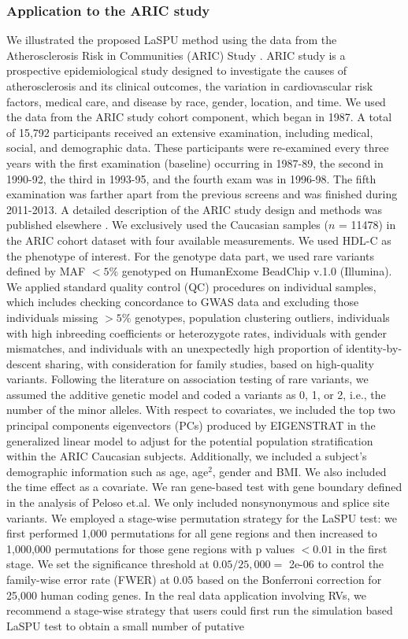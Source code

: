 \documentclass[12pt]{article}
\begin{document}
\subsubsection{Application to the ARIC study}
We illustrated the proposed LaSPU method using the data from the Atherosclerosis Risk in Communities (ARIC) Study \cite{Heiss1989}.  ARIC study is a prospective epidemiological study designed to investigate the causes of atherosclerosis and its clinical outcomes, the variation in cardiovascular risk factors, medical care, and disease by race, gender, location, and time. We used the data from the ARIC study cohort component, which began in 1987. A total of 15,792 participants received an extensive examination, including medical, social, and demographic data. These participants were re-examined every three years with the first examination (baseline) occurring in 1987-89, the second in 1990-92, the third in 1993-95, and the fourth exam was in 1996-98. The fifth examination was farther apart from the previous screens and was finished during 2011-2013. A detailed description of the ARIC study design and methods was published elsewhere \cite{Investigators1989}. We exclusively used the Caucasian samples ($n$ = 11478) in the ARIC cohort dataset with four available measurements. We used HDL-C as the phenotype of interest. For the genotype data part, we used rare variants defined by MAF $< 5\%$ genotyped on HumanExome BeadChip v.1.0 (Illumina).\cite{Grove2013} We applied standard quality control (QC) procedures on individual samples, which includes checking concordance to GWAS data and excluding those individuals missing $>5\%$ genotypes, population clustering outliers, individuals with high inbreeding coefficients or heterozygote rates, individuals with gender mismatches, and individuals with an unexpectedly high proportion of identity-by-descent sharing, with consideration for family studies, based on high-quality variants. Following the literature on association testing of rare variants, we assumed the additive genetic model and coded a variants as 0, 1, or 2, i.e., the number of the minor alleles. With respect to covariates, we included the top two principal components eigenvectors (PCs) produced by EIGENSTRAT \cite{Price2006} in the generalized linear model to adjust for the potential population stratification within the ARIC Caucasian subjects. Additionally, we included a subject's demographic information such as age, age$^2$, gender and BMI. We also included the time effect as a covariate. We ran gene-based test with gene boundary defined in the analysis of Peloso et.al.\cite{Peloso2014} We only included nonsynonymous and splice site variants. We employed a stage-wise permutation strategy for the LaSPU test: we first performed 1,000 permutations for all gene regions and then increased to 1,000,000 permutations for those gene regions with p values $< 0.01$ in the first stage. We set the significance threshold at $0.05/25,000 =$ 2e-06 to control the family-wise error rate (FWER) at 0.05 based on the Bonferroni correction for 25,000 human coding genes. In the real data application involving RVs, we recommend a stage-wise strategy that users could first run the simulation based LaSPU test to obtain a small number of putative 
\end{document}
